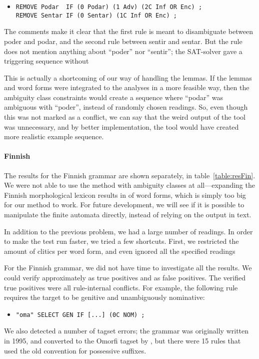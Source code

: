 \begin{itemize}
\item[] 
\begin{verbatim}
REMOVE Podar  IF (0 Podar) (1 Adv) (2C Inf OR Enc) ;
REMOVE Sentar IF (0 Sentar) (1C Inf OR Enc) ;
\end{verbatim}
\end{itemize}

The comments make it clear that the first rule is meant to disambiguate between poder and podar, and the second rule between sentir and sentar. But the rule does not mention anything about ``poder'' nor ``sentir''; the SAT-solver gave a triggering sequence without 

This is actually a shortcoming of our way of handling the lemmas. If the lemmas and word forms were integrated to the analyses in a more feasible way, then the ambiguity class constraints would create a sequence where ``podar'' was ambiguous with ``poder'', instead of randomly chosen readings. So, even though this was not marked as a conflict, we can say that the weird output of the tool was unnecessary, and by better implementation, the tool would have created more realistic example sequence.




\paragraph{Finnish} 

The results for the Finnish grammar are shown separately, in table~\ref{table:resFin}.
We were not able to use the method with ambiguity classes at all---expanding the Finnish morphological lexicon results in  of word forms, which is simply too big for our method to work. 
For future development, we will see if it is possible to manipulate the finite automata directly, instead of relying on the output in text.

In addition to the previous problem, we had a large number of readings. In order to make the test run faster, we tried a few shortcuts. First, we restricted the amount of clitics per word form, and even ignored all the specified readings

For the Finnish grammar, we did not have time to investigate all the
results. We could verify approximately  as true positives and
 as false positives.
The verified true positives were all rule-internal conflicts. 
For example, the following rule requires the target to be genitive and unambiguously nominative: 
\begin{itemize}
\item[]\texttt{"oma" SELECT GEN IF [...] (0C NOM) ;}
\end{itemize}
We also detected a number of tagset errors;
the grammar was originally written in 1995, and converted to the
Omorfi tagset by \cite{pirinen2015}, but there were 15 rules that used the old convention for possessive suffixes.

